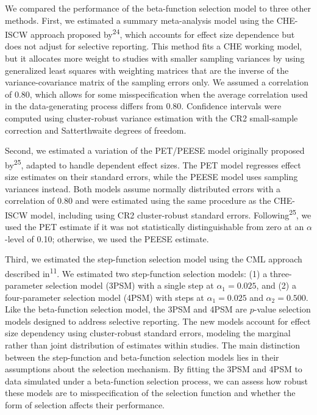 \documentclass[
  american,
  man, donotrepeattitle,floatsintext]{apa7}
\begin{document}
We compared the performance of the beta-function selection model to three other methods. First, we estimated a summary meta-analysis model using the CHE-ISCW approach proposed by\textsuperscript{24}, which accounts for effect size dependence but does not adjust for selective reporting. This method fits a CHE working model, but it allocates more weight to studies with smaller sampling variances by using generalized least squares with weighting matrices that are the inverse of the variance-covariance matrix of the sampling errors only. We assumed a correlation of 0.80, which allows for some misspecification when the average correlation used in the data-generating process differs from 0.80. Confidence intervals were computed using cluster-robust variance estimation with the CR2 small-sample correction and Satterthwaite degrees of freedom.

Second, we estimated a variation of the PET/PEESE model originally proposed by\textsuperscript{25}, adapted to handle dependent effect sizes. The PET model regresses effect size estimates on their standard errors, while the PEESE model uses sampling variances instead. Both models assume normally distributed errors with a correlation of 0.80 and were estimated using the same procedure as the CHE-ISCW model, including using CR2 cluster-robust standard errors. Following\textsuperscript{25}, we used the PET estimate if it was not statistically distinguishable from zero at an \(\alpha\)-level of 0.10; otherwise, we used the PEESE estimate.

Third, we estimated the step-function selection model using the CML approach described in\textsuperscript{11}. We estimated two step-function selection models: (1) a three-parameter selection model (3PSM) with a single step at \(\alpha_1 = 0.025\), and (2) a four-parameter selection model (4PSM) with steps at \(\alpha_1 = 0.025\) and \(\alpha_2 = 0.500\). Like the beta-function selection model, the 3PSM and 4PSM are \(p\)-value selection models designed to address selective reporting. The new models account for effect size dependency using cluster-robust standard errors, modeling the marginal rather than joint distribution of estimates within studies. The main distinction between the step-function and beta-function selection models lies in their assumptions about the selection mechanism. By fitting the 3PSM and 4PSM to data simulated under a beta-function selection process, we can assess how robust these models are to misspecification of the selection function and whether the form of selection affects their performance.
\end{document}
